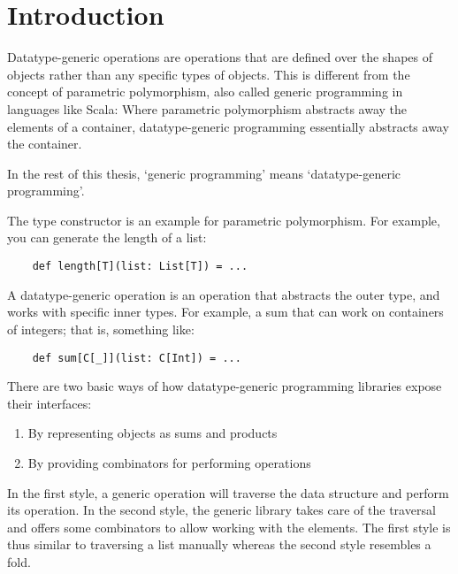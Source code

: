 \chapter{Introduction}
Datatype-generic operations are operations that are defined over the shapes
of objects rather than any specific types of objects. This is different from
the concept of parametric polymorphism, also called generic programming in
languages like Scala:
Where parametric polymorphism abstracts away the elements of a container,
datatype-generic programming essentially abstracts away the container.

In the rest of this thesis, `generic programming' means `datatype-generic
programming'.


\begin{example}
The type constructor  is an example for parametric polymorphism. For
example, you can generate the length of a list:

\begin{lstlisting}
    def length[T](list: List[T]) = ...
\end{lstlisting}
\end{example}

\begin{example}
A datatype-generic operation is an operation that abstracts the outer type, and
works with specific inner types. For example, a sum that can work on containers
of integers; that is, something like:
\begin{lstlisting}
    def sum[C[_]](list: C[Int]) = ...
\end{lstlisting}
\end{example}

There are two basic ways of how datatype-generic programming libraries expose
their interfaces:

\begin{enumerate}
    \item By representing objects as sums and products
    \item By providing combinators for performing operations
\end{enumerate}

In the first style, a generic operation will traverse the data structure and
perform its operation. In the second style, the generic library takes care of
the traversal and offers some combinators to allow working with the elements.
The first style is thus similar to traversing a list manually whereas
the second style resembles a fold.

